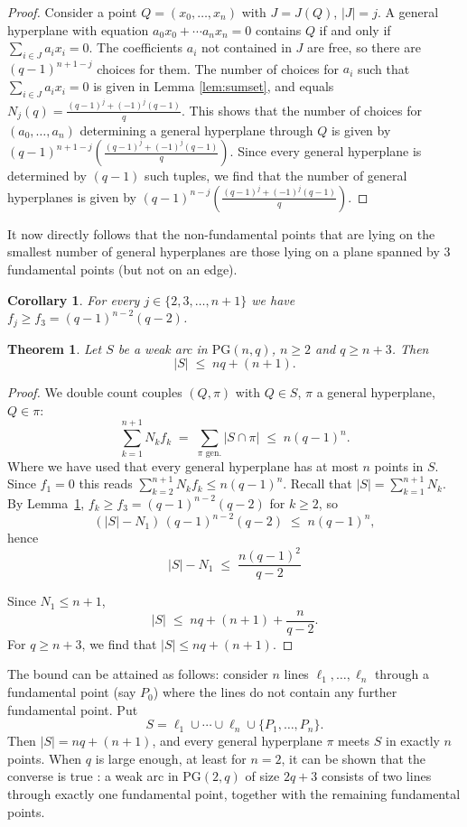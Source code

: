 \documentclass{article}
\newtheorem{theorem}{Theorem}
\newtheorem{corollary}{Corollary}
\newcommand{\PG}{\mathrm{PG}}
\begin{document}
\begin{proof}
Consider a point $Q=(x_0,\ldots,x_n)$ with $J=J(Q)$, $|J|=j$. A general hyperplane with equation $a_0x_0+\cdots a_nx_n=0$ contains $Q$ if and only if 
 $\sum_{i\in J}a_ix_i=0$. The coefficients $a_i$ not contained in $J$ are free, so there are $(q-1)^{n+1-j}$ choices for them. The number of choices for $a_i$ such that $\sum_{i\in J}a_ix_i=0$ is given in Lemma \ref{lem:sumset}, and equals $N_{j}(q)= \frac{(q-1)^{j} + (-1)^{j} (q-1)}{q}.$
 This shows that the number of choices for $(a_0,\ldots,a_n)$ determining a general hyperplane through $Q$ is given by $(q-1)^{n+1-j}(\frac{(q-1)^{j} + (-1)^{j} (q-1)}{q})$. Since every general hyperplane is determined by $(q-1)$ such tuples, we find that the number of general hyperplanes is given by $(q-1)^{n-j}(\frac{(q-1)^{j} + (-1)^{j} (q-1)}{q}).$
\end{proof}

It now directly follows that the non-fundamental points that are lying on the smallest number of general hyperplanes are those lying on a plane spanned by $3$ fundamental points (but not on an edge).
\begin{corollary}\label{lem:fmin}
For every $j\in\{2,3,\dots,n+1\}$ we have $f_j\ge f_3=(q-1)^{n-2}(q-2)$.
\end{corollary}



\begin{theorem}\label{thm:upperboundweakarc}
Let $S$ be a weak arc in $\PG(n,q)$, $n\ge 2$ and $q\ge n+3$. Then
\[
  |S|\;\le\;nq+(n+1).
\]
\end{theorem}

\begin{proof}
We double count couples $(Q,\pi)$ with $Q\in S$, $\pi$ a general hyperplane,
$Q\in\pi$:
\[
  \sum_{k=1}^{n+1}N_k f_k
  \;=\;\sum_{\pi\text{ gen.}}|S\cap\pi|
  \;\le\;n(q-1)^n.
\]
Where we have used that every general hyperplane has at most $n$ points in $S$.
Since $f_1=0$ this reads $\sum_{k=2}^{n+1}N_k f_k\le n(q-1)^n$. Recall that $|S|=\sum_{k=1}^{n+1} N_k$.
By
Lemma~\ref{lem:fmin}, $f_k\ge f_3=(q-1)^{n-2}(q-2)$ for $k\ge 2$, so
\[
  (|S|-N_1)\,(q-1)^{n-2}(q-2)\;\le\;n(q-1)^n,
\]
hence
\[
  |S|-N_1\;\le\;\frac{n(q-1)^2}{q-2}
\]

Since $N_1\le n+1$,
\[
  |S|\;\le\;nq+(n+1)+\frac{n}{q-2}.
\]
For $q\ge n+3$, we find that
$|S|\le nq+(n+1)$.
\end{proof}


The bound can be attained as follows: consider $n$ lines $\ell_1,\dots,\ell_n$ through a fundamental point (say $P_0$) where the lines do not contain any further fundamental point. Put
\[
  S=\ell_1\cup\cdots\cup\ell_n\cup\{P_1,\dots,P_n\}.
\]
Then $|S|=nq+(n+1)$, and every general hyperplane $\pi$ meets $S$ in exactly $n$ points.
When $q$ is large enough, at least for $n=2$, it can be shown that the converse is true \cite{Cassie}: a weak arc in $\PG(2,q)$ of size $2q+3$ consists of two lines through exactly one fundamental point, together with the remaining fundamental points.
\end{document}
